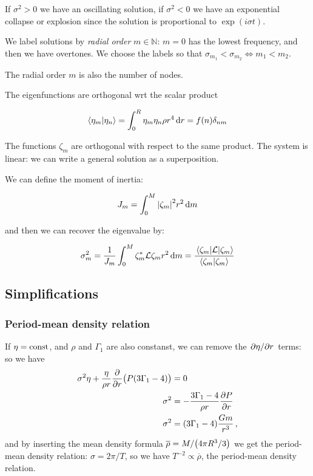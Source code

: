 \documentclass[main.tex]{subfiles}
\begin{document}
If \(\sigma^2 > 0\) we have an oscillating solution, if \(\sigma^2 <0 \) we have an exponential collapse or explosion since the solution is proportional to \(\exp(i \sigma t)\).

We label solutions by \emph{radial order} \(m \in \mathbb{N}\): \(m=0\) has the lowest frequency, and then we have overtones.
We choose the labels so that \(\sigma_{m_1} < \sigma_{m_2} \iff m_1 < m_2\).

The radial order \(m\) is also the number of nodes.

The eigenfunctions are orthogonal wrt the scalar product

\begin{equation}
  \braket{\eta_m}{\eta_n} = \int _{0}   ^{R} \eta_m \eta_n \rho r^4 \dd{r} = f(n) \delta_{nm}
\end{equation}


The functions \(\zeta_m\) are orthogonal with respect to the same product. The system is linear: we can write a general solution as a superposition.

We can define the moment of inertia:

\begin{equation}
  J_m = \int _{0}   ^{M} \abs{\zeta_m}^2 r^2 \dd{m}
\end{equation}

and then we can recover the eigenvalue by:

\begin{equation}
  \sigma_m^2 = \frac{1}{J_m} \int_0^M \zeta_m ^* \mathcal L \zeta_m r^2 \dd{m}
  = \frac{\ev{\mathcal{L}}{\zeta_{m}}}{\braket{\zeta_{m}}{\zeta_{m}}}
\end{equation}

\subsection{Simplifications}

\subsubsection{Period-mean density relation}

If \(\eta = \text{const}\), and \(\rho \) and \(\Gamma_1\) are also constanst, we can remove the \(\pdv*{\eta }{r}\) terms: so we have 
%
\begin{subequations}
\begin{align}
\sigma^2 \eta + \frac{\eta }{\rho r} \pdv{}{r} \qty(P \qty(3 \Gamma_1 - 4)) &= 0  \\
\sigma^2 &= - \frac{3 \Gamma_1 - 4}{\rho r} \pdv{P}{r}  \\
\sigma^2 &= \qty( 3\Gamma_1 -4 ) \frac{Gm}{r^3}
\,,
\end{align}
\end{subequations}
%
and by inserting the mean density formula \(\overline{\rho} = M / \qty(4 \pi R^3 / 3)\) we get the period-mean density relation: \(\sigma = 2 \pi / T\), so we have \(T^{-2} \propto \overline{\rho}\), the period-mean density relation. 
\end{document}
